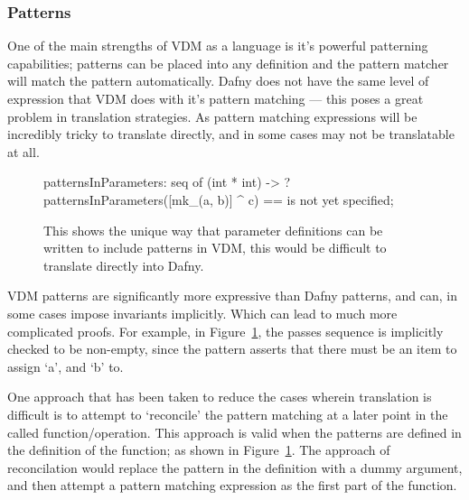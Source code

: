 \documentclass{entcs}
\newcommand{\lfcomment}[1]{\ifthenelse { \boolean{showComments} } {\textcolor{red}{LF:~#1}} { } } %
\begin{document}
\subsubsection{Patterns}\label{section:pattern_problems}

One of the main strengths of VDM as a language is it's powerful patterning capabilities; patterns can be placed into any definition and the pattern matcher will match the pattern automatically. Dafny does not have the same level of expression that VDM does with it's pattern matching --- this poses a great problem in translation strategies. As pattern matching expressions will be incredibly tricky to translate directly, and in some cases may not be translatable at all. 

\begin{figure}[h]
	\begin{center}
        \begin{vdmsl}
patternsInParameters: seq of (int * int) -> ?
patternsInParameters([mk_(a, b)] ^ c) == is not yet specified;
        \end{vdmsl}
		\caption{This shows the unique way that parameter definitions can be written to include patterns in VDM, this would be difficult to translate directly into Dafny. }\label{fig:vdm_patterning}
	\end{center}
\end{figure}

VDM patterns are significantly more expressive than Dafny patterns, and can, in some cases impose invariants implicitly. Which can lead to much more complicated proofs. For example, in Figure~\ref{fig:vdm_patterning}, the passes sequence is implicitly checked to be non-empty, since the pattern asserts that there must be an item to assign `a', and `b' to.

One approach that has been taken to reduce the cases wherein translation is difficult is to attempt to `reconcile' the pattern matching at a later point in the called function/operation. This approach is valid when the patterns are defined in the definition of the function; as shown in Figure~\ref{fig:vdm_patterning}. The approach of reconcilation would replace the pattern in the definition with a dummy argument, and then attempt a pattern matching expression as the first part of the function. 
\end{document}

